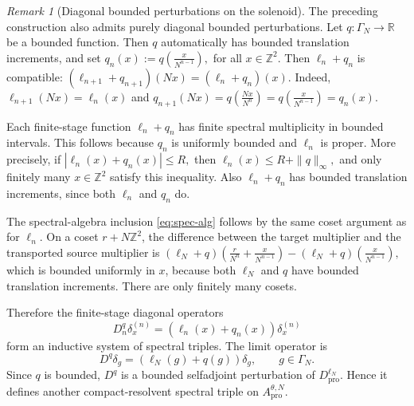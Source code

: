 \documentclass[11pt]{amsart}
\theoremstyle{definition}
\theoremstyle{remark}
\newtheorem{remark}[theorem]{Remark}
\newcommand{\Z}{\mathbb{Z}}
\newcommand{\R}{\mathbb{R}}
\newcommand{\ex}{\mathrm{pro}}
\begin{document}
\begin{remark}[Diagonal bounded perturbations on the solenoid]
\label{rem:solenoid-diagonal-bounded-perturbations}
The preceding construction also admits purely diagonal bounded perturbations.
Let $q\colon \Gamma_N\to\R$ be a bounded function. Then $q$ automatically has
bounded translation increments, and set $q_n(x):=q\left(\frac{x}{N^{n-1}}\right),$ for all
$x\in\Z^2.$
Then $\ell_n+q_n$ is compatible: $(\ell_{n+1}+q_{n+1})(Nx)=(\ell_n+q_n)(x).$
Indeed, $
\ell_{n+1}(Nx)=\ell_n(x)$ and $q_{n+1}(Nx)=q\left(\frac{Nx}{N^n}\right)
=q\left(\frac{x}{N^{n-1}}\right)=q_n(x).$

Each finite-stage function $\ell_n+q_n$ has finite spectral multiplicity in
bounded intervals. This follows because $q_n$ is uniformly bounded and
$\ell_n$ is proper. More precisely, if $|\ell_n(x)+q_n(x)|\le R,$
then $\ell_n(x)\le R+\|q\|_\infty,$
and only finitely many $x\in\Z^2$ satisfy this inequality. Also
$\ell_n+q_n$ has bounded translation increments, since both $\ell_n$ and
$q_n$ do.

The spectral-algebra inclusion \eqref{eq:spec-alg} follows by the same coset
argument as for $\ell_n$. On a coset $r+N\Z^2$, the difference between the
target multiplier and the transported source multiplier is
$(\ell_N+q)\left(\frac{r}{N^n}+\frac{x}{N^{n-1}}\right)-(\ell_N+q)\left(\frac{x}{N^{n-1}}\right),$
which is bounded uniformly in $x$, because both $\ell_N$ and $q$ have
bounded translation increments. There are only finitely many cosets.

Therefore the finite-stage diagonal operators
\[
D_n^q\delta_x^{(n)}
=
(\ell_n(x)+q_n(x))\delta_x^{(n)}
\]
form an inductive system of spectral triples. The limit operator is
\[
D^q\delta_g=(\ell_N(g)+q(g))\delta_g,
\qquad g\in\Gamma_N.
\]
Since $q$ is bounded, $D^q$ is a bounded selfadjoint perturbation of
$D_{\ex}^{\ell_N}$. Hence it defines another compact-resolvent spectral triple
on $A_{\ex}^{\theta,N}$.
\end{remark}
\end{document}
